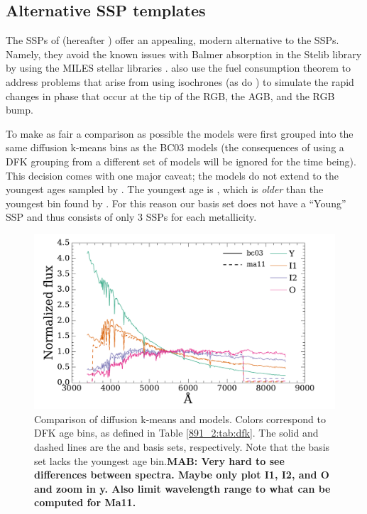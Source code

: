 \subsection{Alternative SSP templates}
\label{891_2:sec:ma11}

The SSPs of \citet{Maraston11} (hereafter )
offer an appealing, modern alternative to the 
SSPs. Namely, they avoid the known issues with Balmer absorption in
the Stelib library \citep{Groves11} by using the MILES stellar
libraries \citep{Vazdekis10,Falcon-Barroso11}. 
also use the fuel consumption theorem
\citep{Renzini81,Buzzoni89,Maraston05} to address problems that arise
from using isochrones (as do ) to simulate the
rapid changes in phase that occur at the tip of the RGB, the AGB, and
the RGB bump.

To make as fair a comparison as possible the 
models were first grouped into the same diffusion k-means bins as the
BC03 models (the consequences of using a DFK grouping from a different
set of models will be ignored for the time being). This decision comes
with one major caveat; the  models do not
extend to the youngest ages sampled by . The
youngest  age is , which is
\emph{older} than the youngest bin found by . For
this reason our  basis set does not have a
``Young'' SSP and thus consists of only 3 SSPs for each metallicity.

\begin{figure}
  \centering
  \includegraphics[width=\columnwidth]{891_2/figs/ma_bc_comp.pdf}
  \caption[Comparison of DFK BC03 and MA11 SSP template
    libraries]{\fixspacing\label{891_2:fig:ma_bc_comp}Comparison of
    diffusion k-means  and
     models. Colors correspond to DFK age bins,
    as defined in Table \ref{891_2:tab:dfk}. The solid and dashed
    lines are the  and 
    basis sets, respectively. Note that the 
    basis set lacks the youngest age bin.{\bf MAB: Very hard to see
      differences between spectra. Maybe only plot I1, I2, and O and
      zoom in y. Also limit wavelength range to what can be computed
      for Ma11.}}
\end{figure}

